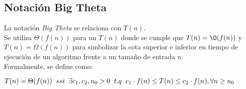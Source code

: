\subsection{Notación Big Theta}
La notación \textit{Big Theta} se relaciona con $T(n)$.\\

Se utiliza $\Theta(f(n))$ para un $T(n)$ donde se cumple que
\(T(n) = \O(f(n))\) y \(T(n) = \Omega(f(n))\) para simbolizar
la cota superior e inferior en tiempo de ejecución de un
algoritmo frente a un tamaño de entrada $n$.\\

Formalmente, se define como:

\begin{center}
  \(T(n) = \Theta(f(n))\hspace{0.2cm}ssi\hspace{0.2cm}\exists c_{1}, c_{2}, n_{0} > 0\hspace{0.2cm}t.q\hspace{0.2cm}c_{1}\cdot f(n) \leq T(n) \leq c_{2}\cdot f(n), \forall{n} \geq n_{0}\)
\end{center}
